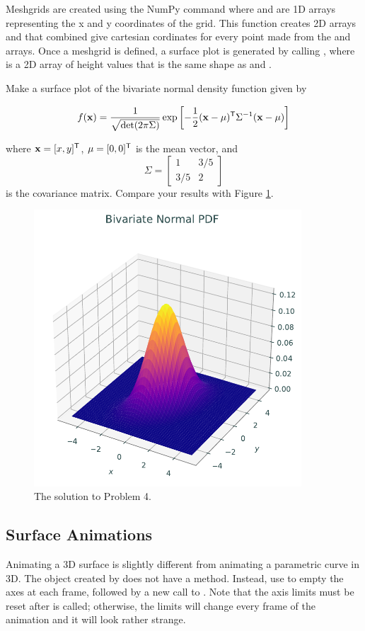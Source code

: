 Meshgrids are created using the NumPy command  where  and  are 1D arrays representing the x and y coordinates of the grid.
This function creates 2D arrays  and  that combined give cartesian cordinates for every point made from the  and  arrays. 
Once a meshgrid is defined, a surface plot is generated by calling , where  is a 2D array of height values that is the same shape as  and . 

\begin{problem}
Make a surface plot of the bivariate normal density function given by

$$f(\mathbf{x})=\frac{1}{\sqrt{\det(2\pi \Sigma)}}\exp{\left[-\frac{1}{2}(\mathbf{x} - \mu)^{\mathsf T}\Sigma^{-1} (\mathbf{x} - \mu)\right]}$$

where $\mathbf{x}=[x,y]^{\mathsf T} $, $\mu=[0,0]^{\mathsf T} $ is the mean vector, and $$\Sigma = \begin{bmatrix} 1 & 3/5 \\ 3/5 & 2 \end{bmatrix}$$ is the covariance matrix. Compare your results with Figure \ref{lab0:surf}.
\end{problem}

\begin{figure}[H]
\centering
\includegraphics[width=100mm]{figures/normal_density.pdf}
\caption{The solution to Problem 4.}
\label{lab0:surf}
\end{figure}

\subsection*{Surface Animations}
Animating a 3D surface is slightly different from animating a parametric curve in 3D.
The object created by  does not have a  method.
Instead, use  to empty the axes at each frame, followed by a new call to .
Note that the axis limits must be reset after  is called; otherwise, the limits will change every frame of the animation and it will look rather strange.

